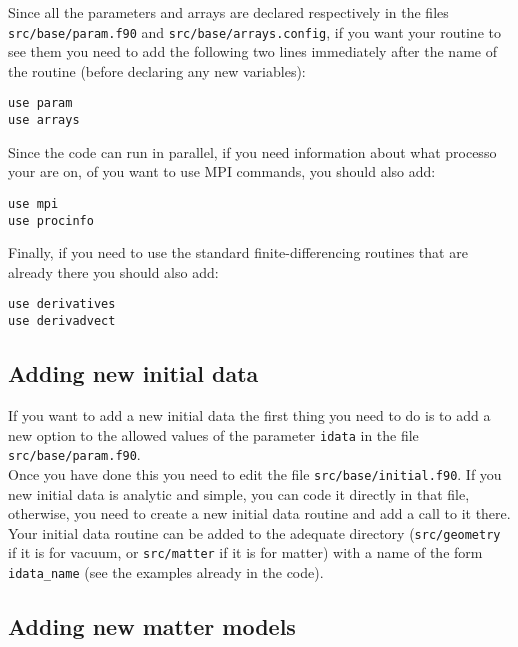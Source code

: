 \documentclass[12pt]{article}
\begin{document}
Since all the parameters and arrays are declared respectively in the
files \texttt{src/base/param.f90} and \texttt{src/base/arrays.config},
if you want your routine to see them you need to add the following two
lines immediately after the name of the routine (before declaring any
new variables):

\begin{verbatim}
use param
use arrays
\end{verbatim}

Since the code can run in parallel, if you need information about what
processo your are on, of you want to use MPI commands, you should
also add:

\begin{verbatim}
use mpi
use procinfo
\end{verbatim}

Finally, if you need to use the standard finite-differencing routines
that are already there you should also add:

\begin{verbatim}
use derivatives
use derivadvect
\end{verbatim}

\vspace{3mm}


\subsection{Adding new initial data}

If you want to add a new initial data the first thing you need to do
is to add a new option to the allowed values of the parameter
\texttt{idata} in the file \texttt{src/base/param.f90}. \\

Once you have done this you need to edit the file
\texttt{src/base/initial.f90}.  If you new initial data is analytic
and simple, you can code it directly in that file, otherwise, you need
to create a new initial data routine and add a call to it there.  Your
initial data routine can be added to the adequate directory
(\texttt{src/geometry} if it is for vacuum, or \texttt{src/matter} if
it is for matter) with a name of the form \texttt{idata\_name} (see
the examples already in the code). \\


\subsection{Adding new matter models}
\end{document}
